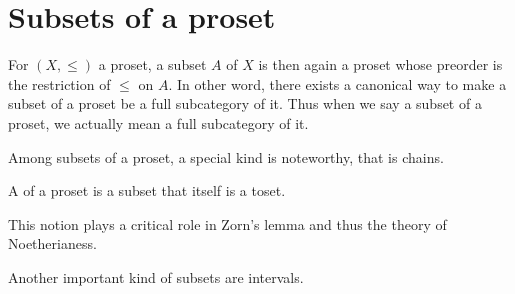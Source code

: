\newpage\section{Subsets of a proset}
  For $(X,\leqslant)$ a proset, a subset $A$ of $X$ is then again a proset whose preorder is the restriction of $\leqslant$ on $A$. In other word, there exists a canonical way to make a subset of a proset be a full subcategory of it. Thus when we say a subset of a proset, we actually mean a full subcategory of it.

  Among subsets of a proset, a special kind is noteworthy, that is chains.
  \begin{defn}
  A  of a proset is a subset that itself is a toset.
  \end{defn}
  This notion plays a critical role in Zorn's lemma and thus the theory of Noetherianess.

  Another important kind of subsets are intervals.


